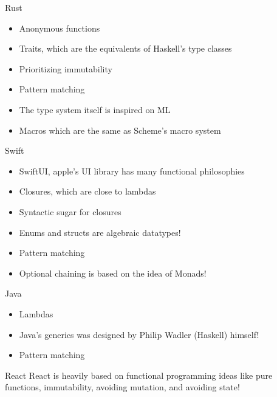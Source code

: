 \documentclass[pdf]{beamer}
\begin{document}
\begin{frame}{Rust}
  \begin{itemize}
  \item Anonymous functions
  \item Traits, which are the equivalents of Haskell's type classes
  \item Prioritizing immutability
  \item Pattern matching
  \item The type system itself is inspired on ML
  \item Macros which are the same as Scheme's macro system
  \end{itemize}
\end{frame}

\begin{frame}{Swift}
  \begin{itemize}
  \item SwiftUI, apple's UI library has many functional philosophies
  \item Closures, which are close to lambdas
  \item Syntactic sugar for closures
  \item Enums and structs are algebraic datatypes!
  \item Pattern matching
  \item Optional chaining is based on the idea of Monads!
  \end{itemize}
\end{frame}

\begin{frame}{Java}
  \begin{itemize}
  \item Lambdas
  \item Java's generics was designed by Philip Wadler (Haskell) himself!
  \item Pattern matching
  \end{itemize}
\end{frame}

\begin{frame}{React}
  React is heavily based on functional programming ideas like pure functions, immutability, avoiding mutation, and avoiding state!
\end{frame}
\end{document}

